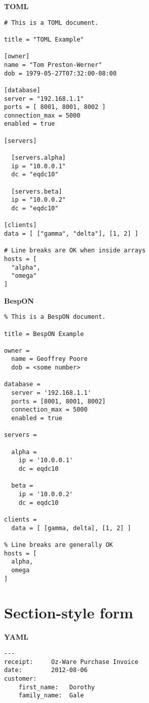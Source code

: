 \documentclass[11pt]{article}
\begin{document}
{{\begin{appendices}
\begin{tcolorbox}{}
\begin{multicols}{2}
\centering \textbf{TOML}
\begin{Verbatim}[formatcom=\color{DarkGreen}]
# This is a TOML document.

title = "TOML Example"

[owner]
name = "Tom Preston-Werner"
dob = 1979-05-27T07:32:00-08:00

[database]
server = "192.168.1.1"
ports = [ 8001, 8001, 8002 ]
connection_max = 5000
enabled = true

[servers]

  [servers.alpha]
  ip = "10.0.0.1"
  dc = "eqdc10"

  [servers.beta]
  ip = "10.0.0.2"
  dc = "eqdc10"

[clients]
data = [ ["gamma", "delta"], [1, 2] ]

# Line breaks are OK when inside arrays
hosts = [
  "alpha",
  "omega"
]
\end{Verbatim}
\columnbreak
\centering \textbf{BespON}

\begin{Verbatim}
% This is a BespON document.

title = BespON Example

owner =
  name = Geoffrey Poore
  dob = <some number>

database =
  server = '192.168.1.1'
  ports = [8001, 8001, 8002]
  connection_max = 5000
  enabled = true

servers =

  alpha = 
    ip = '10.0.0.1'
    dc = eqdc10

  beta =
    ip = '10.0.0.2'
    dc = eqdc10

clients =
  data = [ [gamma, delta], [1, 2] ]

% Line breaks are generally OK
hosts = [
  alpha,
  omega
]
\end{Verbatim}
\end{multicols}
\end{tcolorbox}



\section{Section-style form}




\begin{tcolorbox}{}
\begin{multicols}{2}

\centering \textbf{YAML}
\begin{Verbatim}[formatcom=\color{DarkGreen}]
---
receipt:     Oz-Ware Purchase Invoice
date:        2012-08-06
customer:
    first_name:   Dorothy
    family_name:  Gale


\end{Verbatim}
\end{multicols}
\end{tcolorbox}
\end{appendices}}}
\end{document}
